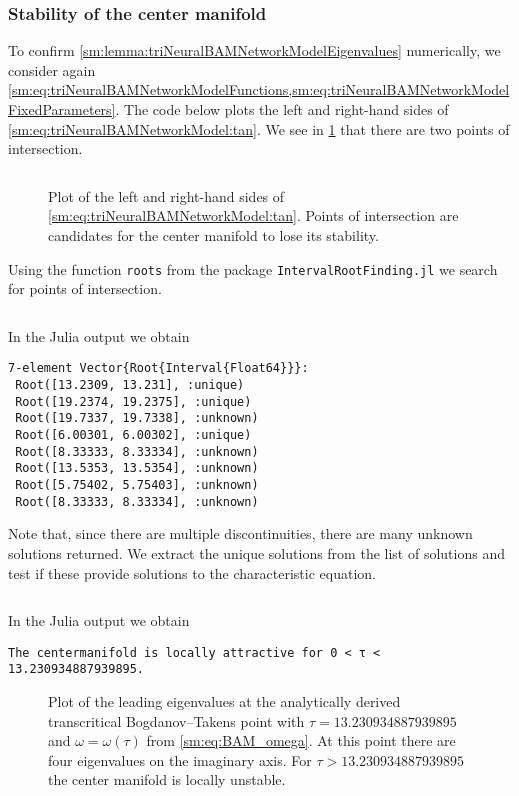 \subsubsection{Stability of the center manifold}
To confirm \cref{sm:lemma:triNeuralBAMNetworkModelEigenvalues} numerically, we
consider again
\cref{sm:eq:triNeuralBAMNetworkModelFunctions,sm:eq:triNeuralBAMNetworkModelFixedParameters}.
The code below plots the left and right-hand sides of
\cref{sm:eq:triNeuralBAMNetworkModel:tan}. We see in
\cref{sm:fig:triNeuralBAMNetworkStabilityDeterminingFunction} that there are
two points of intersection.
\inputminted[firstline=421, lastline=439]{julia}{\pathToJuliaFiles/triNeuralBAMNetworkModel_simulation_article.jl}
\begin{figure}[ht]
    \centering
    \caption{Plot of the left and right-hand sides of
    \cref{sm:eq:triNeuralBAMNetworkModel:tan}. Points of intersection are
    candidates for the center manifold to lose its stability.}
    \label{sm:fig:triNeuralBAMNetworkStabilityDeterminingFunction}
\end{figure}
Using the function \texttt{roots} from the package {\tt IntervalRootFinding.jl}
we search for points of intersection. 
\inputminted[firstline=441, lastline=444]{julia}{\pathToJuliaFiles/triNeuralBAMNetworkModel_simulation_article.jl}
In the Julia output we obtain
\begin{verbatim}
7-element Vector{Root{Interval{Float64}}}:
 Root([13.2309, 13.231], :unique)
 Root([19.2374, 19.2375], :unique)
 Root([19.7337, 19.7338], :unknown)
 Root([6.00301, 6.00302], :unique)
 Root([8.33333, 8.33334], :unknown)
 Root([13.5353, 13.5354], :unknown)
 Root([5.75402, 5.75403], :unknown)
 Root([8.33333, 8.33334], :unknown)
\end{verbatim}
Note that, since there are multiple discontinuities, there are many unknown
solutions returned. We extract the unique solutions from the list of solutions
and test if these provide solutions to the characteristic equation.
\inputminted[firstline=446, lastline=457]{julia}{\pathToJuliaFiles/triNeuralBAMNetworkModel_simulation_article.jl}
In the Julia output we obtain
\begin{verbatim}
The centermanifold is locally attractive for 0 < τ < 13.230934887939895.
\end{verbatim}

\begin{figure}[ht]
    \centering
    \caption{Plot of the leading eigenvalues at the analytically derived
    transcritical Bogdanov--Takens point with $\tau = 13.230934887939895$
    and $\omega = \omega(\tau)$ from \cref{sm:eq:BAM_omega}. At this
    point there are four eigenvalues on the imaginary axis. For
    $\tau > 13.230934887939895$ the center manifold is locally unstable.}
    \label{sm:fig:triNeuralBAMNetworkModelEigenvalues}
\end{figure}
